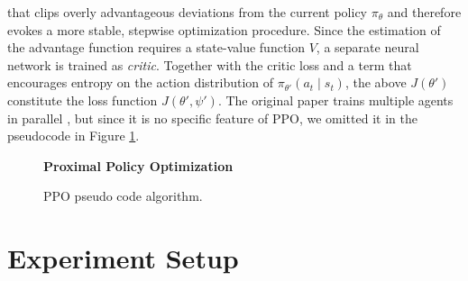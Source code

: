 \documentclass[a4paper, 11pt]{article}
\begin{document}
	that clips overly advantageous deviations from the current policy $\pi_{\theta}$ and therefore evokes a more stable, stepwise optimization procedure. Since the estimation of the advantage function requires a state-value function $V$, a separate neural network is trained as \textit{critic}. Together with the critic loss and a term that encourages entropy on the action distribution of $\pi_{\theta'}(a_t\mid s_t)$, the above $J(\theta')$ constitute the loss function $J(\theta',\psi')$. The original paper trains multiple agents in parallel \cite{schulman2017proximal}, but since it is no specific feature of PPO, we omitted it in the pseudocode in Figure \ref{fig:ppo}.
	\begin{figure}[H]
		\begin{algorithm}[H]
			\caption{\textbf{Proximal Policy Optimization}}
			\small %
			\raggedright
			\renewcommand{\algorithmicrequire}{\textbf{Initialize:}} %
			\begin{algorithmic}[1]
				\ENDFOR
				\ENDFOR
				\ENDWHILE
			\end{algorithmic}
		\end{algorithm}
		\caption{PPO pseudo code algorithm.}
		\label{fig:ppo}
	\end{figure}
	\section{Experiment Setup}
\end{document}
